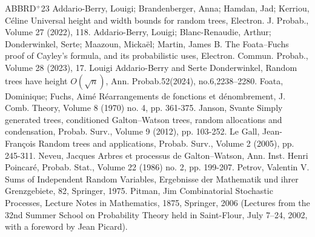 \begin{thebibliography}{ABBRD$^{+}$23}
 Addario-Berry, Louigi; Brandenberger, Anna; Hamdan, Jad; Kerriou, Céline Universal height and width bounds for random trees, Electron. J. Probab., Volume 27 (2022), 118.
 Addario-Berry, Louigi; Blanc-Renaudie, Arthur; Donderwinkel, Serte; Maazoun, Mickaël; Martin, James B. The Foata–Fuchs proof of Cayley’s formula, and its probabilistic uses, Electron. Commun. Probab., Volume 28 (2023), 17.
 Louigi Addario-Berry and Serte Donderwinkel, Random trees have height $O(\sqrt{n})$, Ann. Probab.52(2024), no.6,2238–2280.
 Foata, Dominique; Fuchs, Aimé Réarrangements de fonctions et dénombrement, J. Comb. Theory, Volume 8 (1970) no. 4, pp. 361-375.
 Janson, Svante Simply generated trees, conditioned Galton–Watson trees, random allocations and condensation, Probab. Surv., Volume 9 (2012), pp. 103-252.
 Le Gall, Jean-François Random trees and applications, Probab. Surv., Volume 2 (2005), pp. 245-311.
 Neveu, Jacques Arbres et processus de Galton–Watson, Ann. Inst. Henri Poincaré, Probab. Stat., Volume 22 (1986) no. 2, pp. 199-207.
 Petrov, Valentin V. Sums of Independent Random Variables, Ergebnisse der Mathematik und ihrer Grenzgebiete, 82, Springer, 1975.
 Pitman, Jim Combinatorial Stochastic Processes, Lecture Notes in Mathematics, 1875, Springer, 2006 (Lectures from the 32nd Summer School on Probability Theory held in Saint-Flour, July 7–24, 2002, with a foreword by Jean Picard).
\end{thebibliography}
